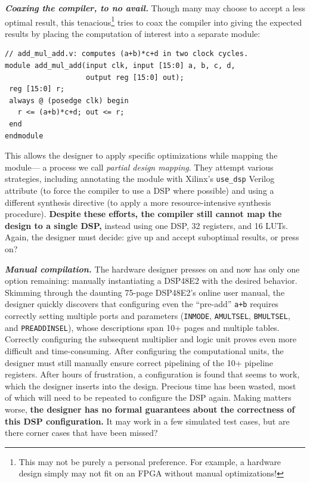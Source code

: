 \textit{\textbf{Coaxing the compiler, to no avail.}}
Though many 
may choose to accept a less optimal result,
 this tenacious\footnote{
This may not be purely a personal preference. %
For example, a hardware design simply may not fit on an FPGA
  without manual optimizations!}
  tries to coax
  the compiler into giving the 
  expected results
  by 
  placing the computation
  of interest into a separate module:

\begin{verbatim}
// add_mul_add.v: computes (a+b)*c+d in two clock cycles.
module add_mul_add(input clk, input [15:0] a, b, c, d,
                   output reg [15:0] out);
 reg [15:0] r;
 always @ (posedge clk) begin
   r <= (a+b)*c+d; out <= r;
 end
endmodule
\end{verbatim}

\noindent
This allows the designer
  to  apply
  specific optimizations while mapping
  the module---%
  a process we call \textit{partial design mapping}.
They attempt various strategies,
  including
  annotating the module with
  Xilinx's \texttt{use\_dsp} Verilog attribute
  (to force the compiler to use a DSP where possible)
  and using a different
  synthesis directive
  (to apply a more 
  resource-intensive synthesis
  procedure).
\textbf{Despite these efforts,
  the compiler still cannot 
  map the design
  to a single DSP,}
  instead using one DSP, 
  32 registers, and 16 LUTs.
Again, the designer must decide:
  give up and accept
  suboptimal results,
  or press on?

\textit{\textbf{Manual compilation.}}
The hardware designer presses on and
  now has only one option remaining:
  manually instantiating a DSP48E2
  with the desired behavior.
Skimming through the daunting 75-page DSP48E2's online user manual,
  the designer quickly discovers that
  configuring even
  the ``pre-add'' \texttt{a+b}
  requires correctly setting 
  multiple ports and parameters
  (\texttt{INMODE}, \texttt{AMULTSEL}, \texttt{BMULTSEL}, and \texttt{PREADDINSEL}),
  whose descriptions span 10+ pages and multiple tables.
Correctly configuring the subsequent multiplier
  and logic unit proves even more difficult
  and time-consuming.
After configuring the computational units,
  the designer must still manually ensure
  correct pipelining
  of the 10+ pipeline registers.
After hours
  of frustration,
  a configuration is found that 
  seems to work, which the designer
  inserts into the design.
Precious time has been wasted,
  most of which will need to be repeated
  to configure the DSP again.
Making matters worse,
  \textbf{the designer has no formal guarantees
  about the correctness of this DSP configuration.}
It may work in a few simulated test cases,
  but are there corner cases
  that have been missed?\tighten

